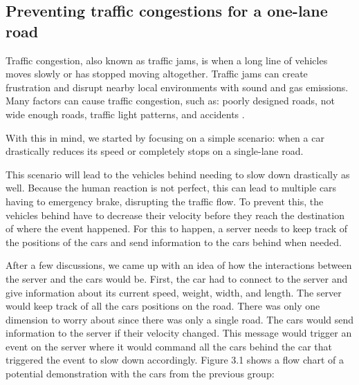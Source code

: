 \subsection{Preventing traffic congestions for a one-lane road}

Traffic congestion, also known as traffic jams, is when a long line of vehicles moves slowly or has stopped moving altogether. Traffic jams can create frustration and disrupt nearby local environments with sound and gas emissions. Many factors can cause traffic congestion, such as:
poorly designed roads, not wide enough roads, traffic light patterns, and accidents \parencite{traffic_congestion}.

With this in mind, we started by focusing on a simple scenario: when a car drastically reduces its speed or completely stops on a single-lane road. 

This scenario will lead to the vehicles behind needing to slow down drastically as well. Because the human reaction is not perfect, this can lead to multiple cars having to emergency brake, disrupting the traffic flow. To prevent this, the vehicles behind have to decrease their velocity before they reach the destination of where the event happened. For this to happen, a server needs to keep track of the positions of the cars and send information to the cars behind when needed. 

After a few discussions, we came up with an idea of how the interactions between the server and the cars would be. First, the car had to connect to the server and give information about its current speed, weight, width, and length. The server would keep track of all the cars positions on the road. There was only one dimension to worry about since there was only a single road. The cars would send information to the server if their velocity changed. This message would trigger an event on the server where it would command all the cars behind the car that triggered the event to slow down accordingly. Figure 3.1 shows a flow chart of a potential demonstration with the cars from the previous group:

